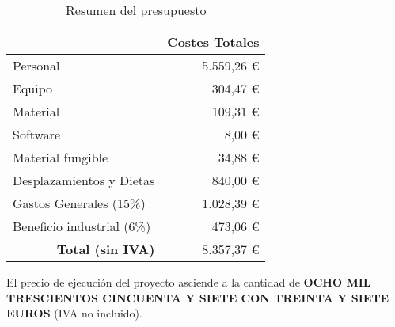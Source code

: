 \begin{table}[H]
	\centering
	\caption{Resumen del presupuesto}
	\label{tab:presupuesto_total}
	\begin{tabular}{l|r|}
		\hline
		\rowcolor[HTML]{BFBFBF}
		\multicolumn{1}{|c|}{\cellcolor[HTML]{BFBFBF}\textbf{Presupuestos}} & \multicolumn{1}{c|}{\cellcolor[HTML]{BFBFBF}\textbf{Costes Totales}} \\ \hline
		\multicolumn{1}{|l|}{Personal}                                      & 5.559,26 €                                                           \\ \hline
		\multicolumn{1}{|l|}{Equipo}                                        & 304,47 €                                                             \\ \hline
		\multicolumn{1}{|l|}{Material}                                      & 109,31 €                                                             \\ \hline
		\multicolumn{1}{|l|}{Software}                                      & 8,00 €                                                               \\ \hline
		\multicolumn{1}{|l|}{Material fungible}                             & 34,88 €                                                              \\ \hline
		\multicolumn{1}{|l|}{Desplazamientos y Dietas}                      & 840,00 €                                                             \\ \hline
		\multicolumn{1}{|l|}{Gastos Generales (15\%)}                       & 1.028,39 €                                                           \\ \hline
		\multicolumn{1}{|l|}{Beneficio industrial (6\%)}                    & 473,06 €                                                             \\ \hline
		\multicolumn{1}{r|}{\textbf{Total (sin IVA)}}                       & 8.357,37 €                                                           \\ \cline{2-2}
	\end{tabular}
\end{table}

\noindent
El precio de ejecución del proyecto asciende a la cantidad de \MakeUppercase{\textbf{ocho mil trescientos cincuenta y siete con treinta y siete euros}} (IVA no incluido).
